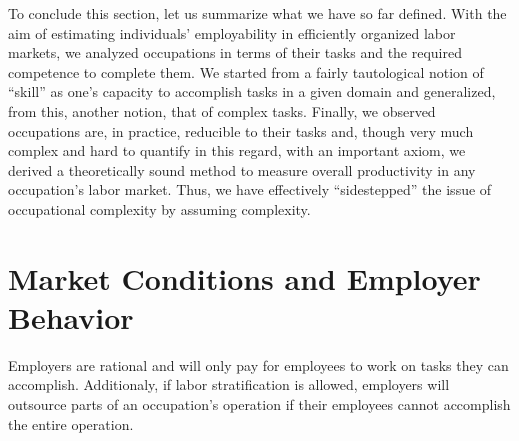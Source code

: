 \documentclass[hidelinks, nonatbib]{elsarticle}
\begin{document}
To conclude this section, let us summarize what we have so far defined. With the aim of estimating individuals' employability in efficiently organized labor markets, we analyzed occupations in terms of their tasks and the required competence to complete them. We started from a fairly tautological notion of ``skill'' as one's capacity to accomplish tasks in a given domain and generalized, from this, another notion, that of complex tasks. Finally, we observed occupations are, in practice, reducible to their tasks and, though very much complex and hard to quantify in this regard, with an important axiom, we derived a theoretically sound method to measure overall productivity in any occupation's labor market. Thus, we have effectively ``sidestepped'' the issue of occupational complexity by assuming complexity.

\section{Market Conditions and Employer Behavior}
\begin{axiom}
    \label{era}
    Employers are rational and will only pay for employees to work on tasks they can accomplish. Additionaly, if labor stratification is allowed, employers will outsource parts of an occupation's operation if their employees cannot accomplish the entire operation.
\end{axiom}
\end{document}
